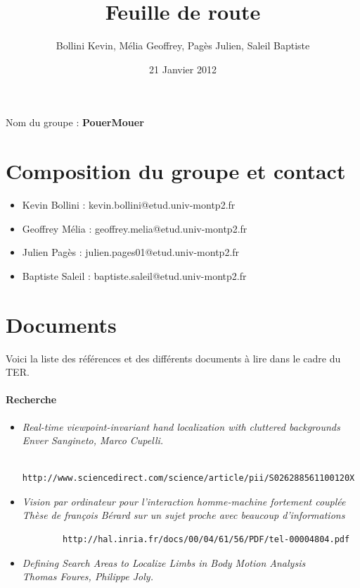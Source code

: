 \documentclass{article}
\title{Feuille de route}
\author{Bollini Kevin, Mélia Geoffrey, Pagès Julien, Saleil Baptiste}
\date{21 Janvier 2012}
\begin{document}
\maketitle
	Nom du groupe : \textbf{PouerMouer}
	\section{Composition du groupe et contact}
	
	\begin{itemize}
	\item Kevin Bollini : kevin.bollini@etud.univ-montp2.fr \\
	\item Geoffrey Mélia : geoffrey.melia@etud.univ-montp2.fr \\
	\item Julien Pagès : julien.pages01@etud.univ-montp2.fr \\
	\item Baptiste Saleil : baptiste.saleil@etud.univ-montp2.fr \\
	\end{itemize} 	

\section{Documents}
	Voici la liste des références et des différents documents à lire dans le cadre du TER. 

	\paragraph{Recherche}
	\begin{itemize}
		\item \it{Real-time viewpoint-invariant hand localization with cluttered backgrounds} \\
		Enver Sangineto, Marco Cupelli.
		\begin{verbatim}
		http://www.sciencedirect.com/science/article/pii/S026288561100120X
		\end{verbatim}
		\item \it{Vision par ordinateur pour l’interaction homme-machine fortement couplée}\\
		Thèse de françois Bérard sur un sujet proche avec beaucoup d'informations
		\begin{verbatim}
		http://hal.inria.fr/docs/00/04/61/56/PDF/tel-00004804.pdf
		\end{verbatim}
		\item \it{Defining Search Areas to Localize Limbs in Body Motion Analysis} \\
		Thomas Foures, Philippe Joly.
	\end{itemize}
\end{document}

